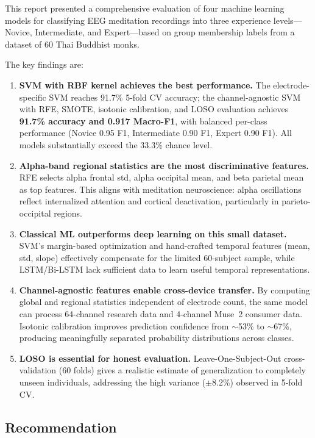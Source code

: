 \documentclass[12pt,a4paper]{article}
\begin{document}
This report presented a comprehensive evaluation of four machine learning models for classifying EEG meditation recordings into three experience levels---Novice, Intermediate, and Expert---based on group membership labels from a dataset of 60 Thai Buddhist monks.

The key findings are:

\begin{enumerate}
  \item \textbf{SVM with RBF kernel achieves the best performance.} The electrode-specific SVM reaches 91.7\% 5-fold CV accuracy; the channel-agnostic SVM with RFE, SMOTE, isotonic calibration, and LOSO evaluation achieves \textbf{91.7\% accuracy and 0.917 Macro-F1}, with balanced per-class performance (Novice 0.95 F1, Intermediate 0.90 F1, Expert 0.90 F1). All models substantially exceed the 33.3\% chance level.

  \item \textbf{Alpha-band regional statistics are the most discriminative features.} RFE selects alpha frontal std, alpha occipital mean, and beta parietal mean as top features. This aligns with meditation neuroscience: alpha oscillations reflect internalized attention and cortical deactivation, particularly in parieto-occipital regions.

  \item \textbf{Classical ML outperforms deep learning on this small dataset.} SVM's margin-based optimization and hand-crafted temporal features (mean, std, slope) effectively compensate for the limited 60-subject sample, while LSTM/Bi-LSTM lack sufficient data to learn useful temporal representations.

  \item \textbf{Channel-agnostic features enable cross-device transfer.} By computing global and regional statistics independent of electrode count, the same model can process 64-channel research data and 4-channel Muse~2 consumer data. Isotonic calibration improves prediction confidence from $\sim$53\% to $\sim$67\%, producing meaningfully separated probability distributions across classes.

  \item \textbf{LOSO is essential for honest evaluation.} Leave-One-Subject-Out cross-validation (60 folds) gives a realistic estimate of generalization to completely unseen individuals, addressing the high variance ($\pm$8.2\%) observed in 5-fold CV.
\end{enumerate}

\subsection{Recommendation}
\end{document}
